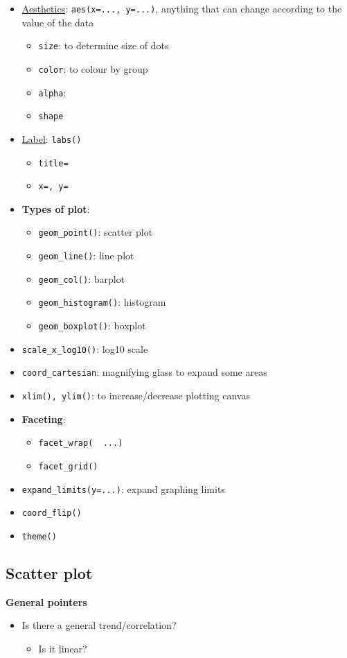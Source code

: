 \documentclass{article}
\begin{document}
\begin{multicols}{2}
\begin{itemize}
	\item \underline{Aesthetics}: \texttt{aes(x=..., y=...)}, anything that can change according to the value of the data
	\begin{itemize}
		\item \texttt{size}: to determine size of dots
		\item \texttt{color}: to colour by group
		\item \texttt{alpha}:
		\item \texttt{shape}
	\end{itemize}
    \item \underline{Label}: \texttt{labs()}
    \begin{itemize}
    	\item \texttt{title=}
    	\item \texttt{x=, y=}
    \end{itemize}
    \item \textbf{Types of plot}:
    \begin{itemize}
    	\item \texttt{geom\_point()}: scatter plot
    	\item \texttt{geom\_line()}: line plot
    	\item \texttt{geom\_col()}: barplot
    	\item \texttt{geom\_histogram()}: histogram
    	\item \texttt{geom\_boxplot()}: boxplot
    \end{itemize}
	\item \texttt{scale\_x\_log10()}: log10 scale
	\item \texttt{coord\_cartesian}: magnifying glass to expand some areas
	\item \texttt{xlim(), ylim()}: to increase/decrease plotting canvas
	\item \textbf{Faceting}:
	\begin{itemize}
		\item \texttt{facet\_wrap(~ ...)}
		\item \texttt{facet\_grid()}
	\end{itemize}
	\item \texttt{expand\_limits(y=...)}: expand graphing limits
	\item \texttt{coord\_flip()}
	\item \texttt{theme()}
\end{itemize}

\subsection{Scatter plot}
\textbf{General pointers}
\begin{itemize}
	\item Is there a general trend/correlation?
	\begin{itemize}
		\item Is it linear?


\end{itemize}
\end{itemize}
\end{multicols}
\end{document}
